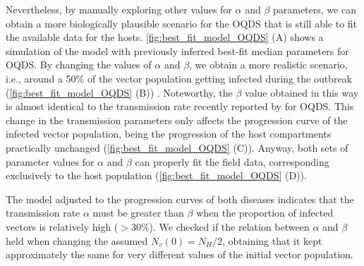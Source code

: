 Nevertheless, by manually exploring other values for $\alpha$ and $\beta$
parameters, we can obtain a more biologically plausible scenario for the OQDS
that is still able to fit the available data for the hosts.
\cref{fig:best_fit_model_OQDS} (A) shows a simulation of the model with
previously inferred best-fit median parameters for OQDS. By changing the values
of $\alpha$ and $\beta$, we obtain a more realistic scenario, i.e., around a
50\% of the vector population getting infected during the outbreak
(\cref{fig:best_fit_model_OQDS} (B)) \cite{Cavalieri2019,
    cornara2017transmission}. Noteworthy, the $\beta$ value obtained in this
way
is almost identical to the transmission rate recently reported by
\cite{Bodino2021} for OQDS. This change in the transmission parameters only
affects the progression curve of the infected vector population, being the
progression of the host compartments practically unchanged
(\cref{fig:best_fit_model_OQDS} (C)). Anyway, both sets of parameter values for
$\alpha$ and $\beta$ can properly fit the field data, corresponding exclusively
to the	host population (\cref{fig:best_fit_model_OQDS} (D)).

The model adjusted to the progression curves of both diseases indicates
that the transmission rate $\alpha$ must be greater than $\beta$ when the
proportion of infected vectors is relatively high ($>30\%$). We checked if the
relation between $\alpha$ and $\beta$ held when changing the assumed
$N_v(0)=N_H/2$, obtaining that it kept approximately the same for very
different values of the initial vector population.

